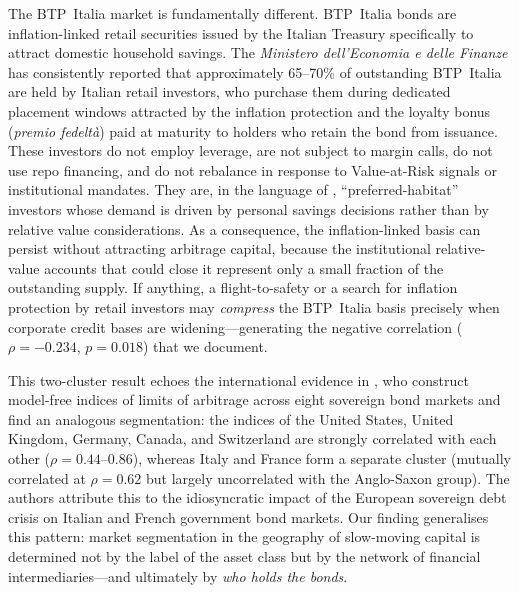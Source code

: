 The BTP~Italia market is fundamentally different.  BTP~Italia bonds are
inflation-linked retail securities issued by the Italian Treasury specifically
to attract domestic household savings.  The \textit{Ministero dell'Economia e
delle Finanze} has consistently reported that approximately 65--70\% of
outstanding BTP~Italia are held by Italian retail investors, who purchase them
during dedicated placement windows attracted by the inflation protection and the
loyalty bonus (\textit{premio fedelt\`{a}}) paid at maturity to holders who
retain the bond from issuance.  These investors do not employ leverage, are not
subject to margin calls, do not use repo financing, and do not rebalance in
response to Value-at-Risk signals or institutional mandates.  They are, in the
language of \citet{VayanosVila2021}, ``preferred-habitat'' investors whose
demand is driven by personal savings decisions rather than by relative value
considerations.  As a consequence, the inflation-linked basis can persist
without attracting arbitrage capital, because the institutional relative-value
accounts that could close it represent only a small fraction of the outstanding
supply.  If anything, a flight-to-safety or a search for inflation protection
by retail investors may \emph{compress} the BTP~Italia basis precisely when
corporate credit bases are widening---generating the negative correlation
($\rho = -0.234$, $p = 0.018$) that we document.

This two-cluster result echoes the international evidence in
\citet{FontaineNolin2019}, who construct model-free indices of limits of
arbitrage across eight sovereign bond markets and find an analogous
segmentation: the indices of the United States, United Kingdom, Germany, Canada,
and Switzerland are strongly correlated with each other
($\rho = 0.44$--$0.86$), whereas Italy and France form a separate cluster
(mutually correlated at $\rho = 0.62$ but largely uncorrelated with the
Anglo-Saxon group).  The authors attribute this to the idiosyncratic impact of
the European sovereign debt crisis on Italian and French government bond
markets.  Our finding generalises this pattern: market segmentation in the
geography of slow-moving capital is determined not by the label of the asset
class but by the network of financial intermediaries---and ultimately by
\emph{who holds the bonds}.

